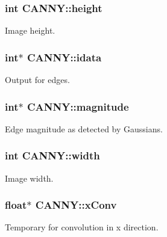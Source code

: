 \subsubsection[{\texorpdfstring{height}{height}}]{\setlength{\rightskip}{0pt plus 5cm}int C\+A\+N\+N\+Y\+::height}\hypertarget{struct_c_a_n_n_y_ae5268e21dce76ee830b2c37538c3f4e5}{}\label{struct_c_a_n_n_y_ae5268e21dce76ee830b2c37538c3f4e5}
Image height. 
\subsubsection[{\texorpdfstring{idata}{idata}}]{\setlength{\rightskip}{0pt plus 5cm}int$\ast$ C\+A\+N\+N\+Y\+::idata}\hypertarget{struct_c_a_n_n_y_a715b48c6b428457c04c7dfd008cf145e}{}\label{struct_c_a_n_n_y_a715b48c6b428457c04c7dfd008cf145e}
Output for edges. 
\subsubsection[{\texorpdfstring{magnitude}{magnitude}}]{\setlength{\rightskip}{0pt plus 5cm}int$\ast$ C\+A\+N\+N\+Y\+::magnitude}\hypertarget{struct_c_a_n_n_y_a4142553c68cae4969658c38710b735ed}{}\label{struct_c_a_n_n_y_a4142553c68cae4969658c38710b735ed}
Edge magnitude as detected by Gaussians. 
\subsubsection[{\texorpdfstring{width}{width}}]{\setlength{\rightskip}{0pt plus 5cm}int C\+A\+N\+N\+Y\+::width}\hypertarget{struct_c_a_n_n_y_abf7b9fa930751c2a0c08ad9d4f36447a}{}\label{struct_c_a_n_n_y_abf7b9fa930751c2a0c08ad9d4f36447a}
Image width. 
\subsubsection[{\texorpdfstring{x\+Conv}{xConv}}]{\setlength{\rightskip}{0pt plus 5cm}float$\ast$ C\+A\+N\+N\+Y\+::x\+Conv}\hypertarget{struct_c_a_n_n_y_a43cadae92c47238ed450e49346531c2d}{}\label{struct_c_a_n_n_y_a43cadae92c47238ed450e49346531c2d}
Temporary for convolution in x direction. 
